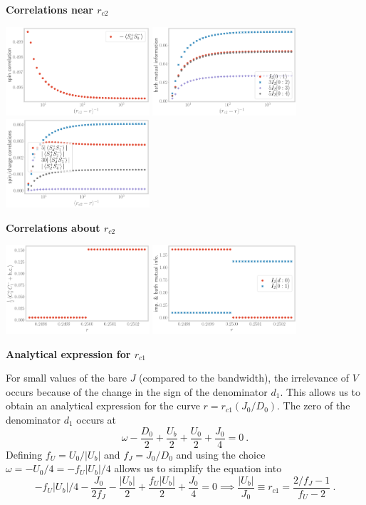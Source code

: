 \documentclass{revtex4-2}
\begin{document}
{\bf Correlations near \(r_{c2}\)}\par\noindent
\includegraphics[width=0.4\textwidth]{rc2-spin-corr.pdf}
\includegraphics[width=0.4\textwidth]{rc2-mut-info-bath.pdf}\\
\includegraphics[width=0.4\textwidth]{rc2-spin-flip-di.pdf}

{\bf Correlations about \(r_{c2}\)}\par\noindent
\includegraphics[width=0.4\textwidth]{charge-flip-01-across.pdf}
\includegraphics[width=0.4\textwidth]{mut-info-d0-01-across.pdf}

{\bf Analytical expression for \(r_{c1}\)}\par\noindent
For small values of the bare \(J\) (compared to the bandwidth), the irrelevance of \(V\) occurs because of the change in the sign of the denominator \(d_1\). This allows us to obtain an analytical expression for the curve \(r = r_{c1}(J_0/D_0)\). The zero of the denominator \(d_1\) occurs at
\[
	\omega - \frac{D_0}{2} + \frac{U_b}{2} + \frac{U_0}{2} + \frac{J_0}{4} = 0~.
\]
Defining \(f_U = U_0/|U_b|\) and \(f_J = J_0/D_0\) and using the choice \(\omega = -U_0/4 = -f_U|U_b|/4\) allows us to simplify the equation into
\[
	-f_U|U_b|/4 - \frac{J_0}{2f_J} - \frac{|U_b|}{2} + \frac{f_U |U_b|}{2} + \frac{J_0}{4} = 0 \implies \frac{|U_b|}{J_0} \equiv r_{c1} = \frac{2/f_J - 1}{f_U - 2}~.
\]

  
\end{document}
